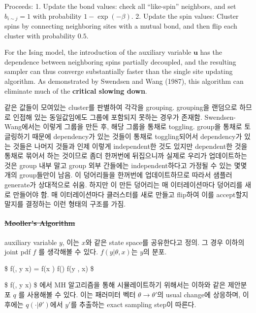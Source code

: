 \documentclass[
]{book}
\begin{document}
Proceeds:
1. Update the bond values: check all ``like-spin'' neighbors, and set \(b_{i \sim j}=1\) with probability \(1-\exp (-\beta)\).
2. Update the spin values: Cluster spins by connecting neighboring sites with a mutual bond, and then flip each cluster with probability \(0.5\).

For the Ising model, the introduction of the auxiliary variable \(\pmb u\) has the dependence between neighboring spins partially decoupled, and the resulting sampler can thus converge substantially faster than the single site updating algorithm. As demonstrated by Swendsen and Wang (1987), this algorithm can eliminate much of the \textbf{critical slowing down}.

같은 값들이 모여있는 cluster를 판별하여 각각을 grouping. grouping을 랜덤으로 하므로 인접해 있는 동일값임에도 그룹에 포함되지 못하는 경우가 존재함. Swendsen-Wang에서는 이렇게 그룹을 만든 후, 해당 그룹을 통채로 toggling. group을 통채로 토글링하기 때문에 dependency가 있는 것들이 통채로 toggling되어서 dependency가 있는 것들은 나머지 것들과 인제 이렇게 independent한 것도 있지만 dependent한 것을 통채로 묶어서 하는 것이므로 좀더 한꺼번에 뒤집으니까 실제로 우리가 업데이트하는 것은 group 내부 말고 group 외부 간들에는 independent하다고 가정될 수 있는 몇몇개의 group들만이 남음. 이 덩어리들을 한꺼번에 업데이트하므로 따라서 샘플러 generate가 상대적으로 쉬움. 하지만 이 만든 덩어리는 매 이터레이션마다 덩어리를 새로 만들어야 함. 매 이터레이션마다 클러스터를 새로 만들고 flip하여 이를 accept할지 말지를 결정하는 이런 형태의 구조를 가짐.

\hypertarget{muxf8ollers-algorithm}{%
\paragraph{\texorpdfstring{\sout{Møoller's Algorithm}}{Møoller's Algorithm}}\label{muxf8ollers-algorithm}}

auxiliary variable \(y\), 이는 \(x\)와 같은 state space를 공유한다고 정의. 그 경우 이하의 joint pdf \(f\) 를 생각해볼 수 있다. \(f(y \vert \theta , x)\)는 \(y\)의 분포.

\$
f(\theta, y \vert x) = f(x \vert \theta) \ast f(\theta) \ast f(y \vert \theta , x)
\$

\$ f(\theta, y \vert x) \$ 에서 MH 알고리즘을 통해 시뮬레이트하기 위해서는 이하와 같은 제안분포 \(q\) 를 사용해볼 수 있다. 이는 패러미터 벡터 \(\theta \rightarrow \theta'\)의 usual change에 상응하며, 이 후에는 \(q(\cdot \vert \theta ' )\)에서 \(y'\)를 추출하는 exact sampling step이 따른다.
\end{document}
